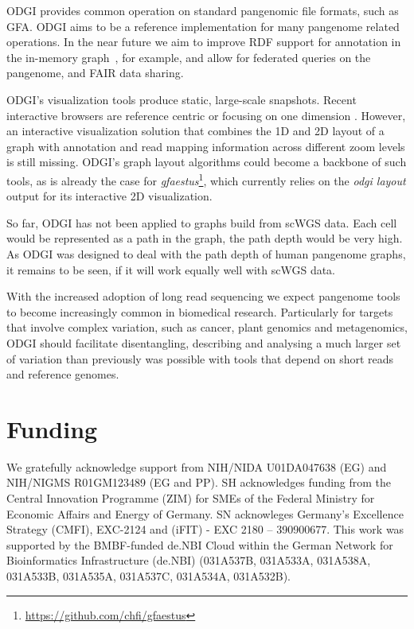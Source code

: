 \documentclass{bioinfo}
\begin{document}
ODGI provides common operation on standard pangenomic file formats, such as GFA. ODGI aims to be a reference implementation for many pangenome related operations. In the near future we aim to improve RDF support for annotation in the in-memory graph~\citep{Yokoyama2020}, for example, and allow for federated queries on the pangenome, and FAIR data sharing.

ODGI's visualization tools produce static, large-scale snapshots. Recent interactive browsers are reference centric \citep{Beyer2019, Yokoyama2019, Durant2021, Liang2021} or focusing on one dimension \citep{Wick_2015, Gonnella2018}. However, an interactive visualization solution that combines the 1D and 2D layout of a graph with annotation and read mapping information across different zoom levels is still missing. ODGI's graph layout algorithms could become a backbone of such tools, as is already the case for \textit{gfaestus}\footnote{\url{https://github.com/chfi/gfaestus}}, which currently relies on the \textit{odgi layout} output for its interactive 2D visualization.

So far, ODGI has not been applied to graphs build from scWGS \citep{Zhuo2021} data. Each cell would be represented as a path in the graph, the path depth would be very high. As ODGI was designed to deal with the path depth of human pangenome graphs, it remains to be seen, if it will work equally well with scWGS data.

With the increased adoption of long read sequencing we expect pangenome tools to become increasingly common in biomedical research. Particularly for targets that involve complex variation, such as cancer, plant genomics and metagenomics, ODGI should facilitate disentangling, describing and analysing a much larger set of variation than previously was possible with tools that depend on short reads and reference genomes.

\section*{Funding}

We gratefully acknowledge support from NIH/NIDA U01DA047638 (EG) and NIH/NIGMS R01GM123489 (EG and PP).
SH acknowledges funding from the Central Innovation Programme (ZIM) for SMEs of the Federal Ministry for Economic Affairs and Energy of Germany. SN acknowleges Germany’s Excellence Strategy (CMFI), EXC-2124 and (iFIT) - EXC 2180 – 390900677.
This work was supported by the BMBF-funded de.NBI Cloud within the German Network for Bioinformatics Infrastructure (de.NBI) (031A537B, 031A533A, 031A538A, 031A533B, 031A535A, 031A537C, 031A534A, 031A532B).
\end{document}
